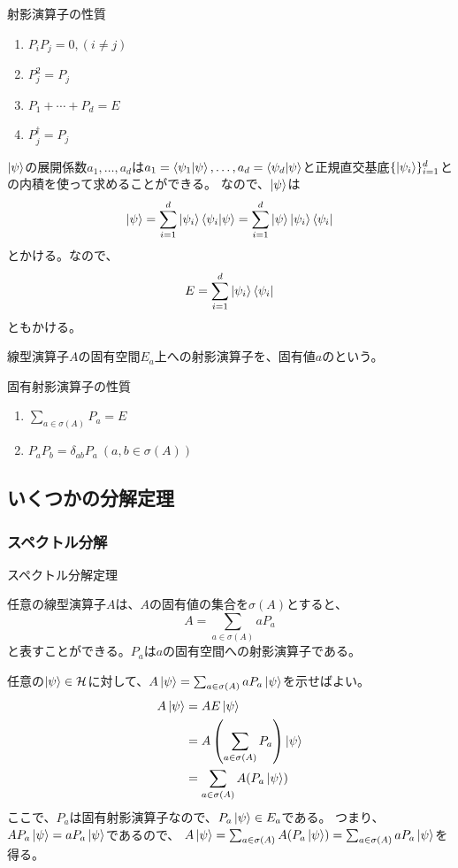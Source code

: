 \begin{Prop} 射影演算子の性質
  \begin{enumerate}
    \item $P_i P_j = 0,(i\neq j)$
    \item $P_j^2 = P_j$
    \item $P_1 + \cdots + P_d = E$
    \item $P_j^\dagger = P_j$
  \end{enumerate}
\end{Prop}

$\ket{\psi}$の展開係数$a_1,\ldots,a_d$は$a_1 = \braket{\psi_1|\psi},\ldots,a_d = \braket{\psi_d|\psi}$と正規直交基底$\{\ket{\psi_i}\}_{i=1}^d$との内積を使って求めることができる。
なので、$\ket{\psi}$は
$$
  \ket{\psi} = \sum_{i=1}^d \ket{\psi_i}\braket{\psi_i|\psi} = \sum_{i=1}^d \ket{\psi} \ket{\psi_i}\bra{\psi_i}
$$
とかける。なので、
$$
  E = \sum_{i=1}^d \ket{\psi_i}\bra{\psi_i}
$$
ともかける。

\begin{Def}
  線型演算子$A$の固有空間$E_a$上への射影演算子を、固有値$a$のという。
\end{Def}

\begin{Prop}固有射影演算子の性質
  \begin{enumerate}
    \item $\sum_{a\in\sigma{(A)}} P_a = E$
    \item $P_a P_b = \delta_{ab}P_a~(a,b\in\sigma(A))$
  \end{enumerate}
\end{Prop}

\subsection{いくつかの分解定理}

\subsubsection{スペクトル分解}
\begin{Theorem}スペクトル分解定理

  任意の線型演算子$A$は、$A$の固有値の集合を$\sigma(A)$とすると、
  $$
  A = \sum_{a\in\sigma{(A)}} aP_a
  $$
  と表すことができる。$P_a$は$a$の固有空間への射影演算子である。
\end{Theorem}
\proof
任意の$\ket{\psi}\in\mathcal{H}$に対して、$A\ket{\psi} = \sum_{a\in\sigma{(A)}} aP_a\ket{\psi}$を示せばよい。
\begin{align}
  A\ket{\psi}
  &= AE\ket{\psi} \\
  &= A\left(\sum_{a\in\sigma{(A)}} P_a\right)\ket{\psi} \\
  &= \sum_{a\in\sigma{(A)}}A (P_a\ket{\psi})
\end{align}
ここで、$P_a$は固有射影演算子なので、$P_a\ket{\psi}\in E_a$である。
つまり、$A P_a\ket{\psi} = aP_a\ket{\psi}$であるので、
$A\ket{\psi} = \sum_{a\in\sigma{(A)}}A (P_a\ket{\psi}) = \sum_{a\in\sigma{(A)}} aP_a \ket{\psi}$を得る。

